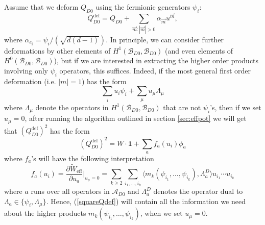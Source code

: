 \documentclass[a4paper,11pt]{article}
\numberwithin{equation}{section}
\begin{document}
Assume that we deform $Q_{D0}$ using the fermionic generators $\psi_{i}$:
\begin{equation}\label{deformQ}
Q_{D0}^{\mathrm{def}} = Q_{D0} + \sum_{\vec{m}:|\vec{m}|>0} \alpha_{\vec{m}} 
u^{\vec{m}},
\end{equation}
where $\alpha_{e_i} = \psi_i/(\sqrt{d(d-1)})$. In principle, we can consider 
further deformations by other elements of 
$H^{1}(\mathcal{B}_{D0},\mathcal{B}_{D0})$ (and even elements of 
$H^{0}(\mathcal{B}_{D0},\mathcal{B}_{D0})$), but if we are interested in 
extracting the higher order products involving only $\psi_{i}$ operators, this
suffices. Indeed, if the most general first order deformation (i.e. $|m|=1$)
has the form
\begin{equation} 
\sum_{i}u_{i}\psi_{i}+\sum_{\mu}u_{\mu}\Lambda_{\mu}
\end{equation}
where $\Lambda_{\mu}$ denote the operators in 
$H^{1}(\mathcal{B}_{D0},\mathcal{B}_{D0})$ that are not $\psi_{i}$'s, then if 
we set $u_{\mu}=0$, after running the algorithm outlined in 
section \ref{sec:effpot} we will get that $(Q_{D0}^{\mathrm{def}})^{2}$ has the 
form
\begin{equation}\label{squareQdef}
(Q_{D0}^{\mathrm{def}})^{2}=W\cdot\mathbf{1}+\sum_{a}f_{a}(u_i)\phi_{a}
\end{equation}
where $f_{a}$'s will have the following interpretation
\begin{equation} 
f_{a}(u_i)=\frac{\partial \widetilde{W}_{\mathrm{eff}}}{\partial 
u_{a}}\Big|_{u_{\mu}=0}=\sum_{k\geq 2}\sum_{i_{1},\ldots,i_{k}}\langle 
m_{k}(\psi_{i_{1}},\ldots,\psi_{i_{k}}),\Lambda^{D}_{a}\rangle 
u_{i_{1}}\cdots u_{i_{k}}
\end{equation}
where $a$ runs over all operators in $\mathcal{A}_{D0}$ and $\Lambda^{D}_{a}$ 
denotes the operator dual to $\Lambda_{a}\in\{\psi_{i},\Lambda_{\mu}\}$. Hence, 
(\ref{squareQdef}) will contain all the information we need about the higher 
products $m_{k}(\psi_{i_{1}},\ldots,\psi_{i_{k}})$, when we set $u_{\mu}=0$.
\end{document}
